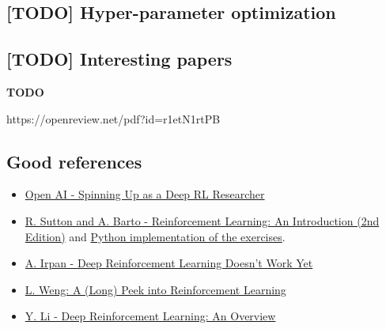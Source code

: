 \documentclass[12pt, english]{article}
\begin{document}
\subsection{[TODO] Hyper-parameter optimization}


\subsection{[TODO] Interesting papers}

\textbf{TODO}

https://openreview.net/pdf?id=r1etN1rtPB


\subsection{Good references}

\begin{itemize}
  \item \href{https://spinningup.openai.com/en/latest/spinningup/spinningup.html}{Open AI - Spinning Up as a Deep RL Researcher}
  \item \href{http://incompleteideas.net/book/the-book-2nd.html}{R. Sutton and A. Barto - Reinforcement Learning: An Introduction (2nd Edition)} and \href{https://github.com/ShangtongZhang/reinforcement-learning-an-introduction}{Python implementation of the exercises}.
  \item \href{https://www.alexirpan.com/2018/02/14/rl-hard.html}{A. Irpan - Deep Reinforcement Learning Doesn't Work Yet}
  \item \href{https://lilianweng.github.io/lil-log/2018/02/19/a-long-peek-into-reinforcement-learning.html}{L. Weng: A (Long) Peek into Reinforcement Learning}
  \item \href{http://arxiv.org/abs/1701.07274}{Y. Li - Deep Reinforcement Learning: An Overview}
\end{itemize}







\end{document}
